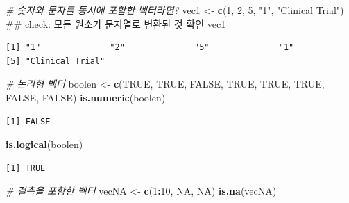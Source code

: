 \documentclass[11pt,a4paper]{book}
\newenvironment{Shaded}{\begin{snugshade}}{\end{snugshade}}
\newcommand{\KeywordTok}[1]{\textcolor[rgb]{0.13,0.29,0.53}{\textbf{#1}}}
\newcommand{\DecValTok}[1]{\textcolor[rgb]{0.00,0.00,0.81}{#1}}
\newcommand{\StringTok}[1]{\textcolor[rgb]{0.31,0.60,0.02}{#1}}
\newcommand{\CommentTok}[1]{\textcolor[rgb]{0.56,0.35,0.01}{\textit{#1}}}
\newcommand{\OtherTok}[1]{\textcolor[rgb]{0.56,0.35,0.01}{#1}}
\newcommand{\OperatorTok}[1]{\textcolor[rgb]{0.81,0.36,0.00}{\textbf{#1}}}
\newcommand{\NormalTok}[1]{#1}
\theoremstyle{definition}
\theoremstyle{definition}
\theoremstyle{definition}
\theoremstyle{remark}
\begin{document}
\begin{Shaded}
\begin{Highlighting}[]
\CommentTok{# 숫자와 문자를 동시에 포함한 벡터라면?}
\NormalTok{vec1 <-}\StringTok{ }\KeywordTok{c}\NormalTok{(}\DecValTok{1}\NormalTok{, }\DecValTok{2}\NormalTok{, }\DecValTok{5}\NormalTok{, }\StringTok{"1"}\NormalTok{, }\StringTok{"Clinical Trial"}\NormalTok{)}
\NormalTok{## check: 모든 원소가 문자열로 변환된 것 확인}
\NormalTok{vec1}
\end{Highlighting}
\end{Shaded}

\begin{verbatim}
[1] "1"              "2"              "5"              "1"             
[5] "Clinical Trial"
\end{verbatim}

\begin{Shaded}
\begin{Highlighting}[]
\CommentTok{# 논리형 벡터}
\NormalTok{boolen <-}\StringTok{ }\KeywordTok{c}\NormalTok{(}\OtherTok{TRUE}\NormalTok{, }\OtherTok{TRUE}\NormalTok{, }\OtherTok{FALSE}\NormalTok{, }\OtherTok{TRUE}\NormalTok{, }\OtherTok{TRUE}\NormalTok{, }\OtherTok{TRUE}\NormalTok{, }\OtherTok{FALSE}\NormalTok{, }\OtherTok{FALSE}\NormalTok{)}
\KeywordTok{is.numeric}\NormalTok{(boolen)}
\end{Highlighting}
\end{Shaded}

\begin{verbatim}
[1] FALSE
\end{verbatim}

\begin{Shaded}
\begin{Highlighting}[]
\KeywordTok{is.logical}\NormalTok{(boolen)}
\end{Highlighting}
\end{Shaded}

\begin{verbatim}
[1] TRUE
\end{verbatim}

\begin{Shaded}
\begin{Highlighting}[]
\CommentTok{# 결측을 포함한 벡터}
\NormalTok{vecNA <-}\StringTok{ }\KeywordTok{c}\NormalTok{(}\DecValTok{1}\OperatorTok{:}\DecValTok{10}\NormalTok{, }\OtherTok{NA}\NormalTok{, }\OtherTok{NA}\NormalTok{)}
\KeywordTok{is.na}\NormalTok{(vecNA)}
\end{Highlighting}
\end{Shaded}
\end{document}
